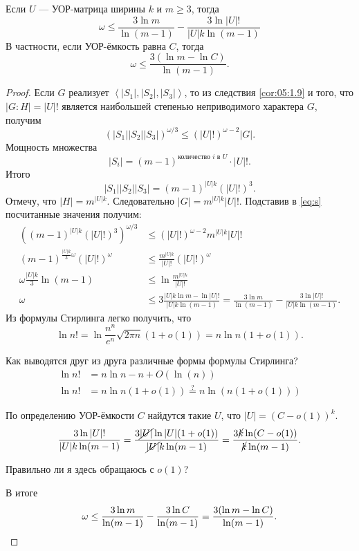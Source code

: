\begin{corollary}\label{cor:05:3.6}
  Если $U$ --- УОР-матрица ширины $k$ и $m \geq 3$, тогда 
  \[
  	\omega \leq \frac{3 \ln m}{\ln(m-1)} - \frac{3 \ln |U|!}{|U| k \ln(m-1)}
  \]
  В частности, если УОР-ёмкость равна $C$, тогда
  \[
  	\omega \leq \frac{3(\ln m - \ln C)}{\ln(m-1)}.
  \]
\end{corollary}
\begin{proof}
  Если $G$ реализует $\left\langle |S_1|,|S_2|,|S_3| \right\rangle$, то из следствия \ref{cor:05:1.9} и того, что $|G:H|=|U|!$ является наибольшей степенью неприводимого характера $G$, получим
  \begin{equation}\label{eq:s}
  	(|S_1||S_2||S_3|)^{\omega/3} \leq (|U|!)^{\omega-2}|G|.
  \end{equation}
  Мощность множества
  \[
  	|S_i|=(m-1)^{\text{количество $i$ в $U$}}\cdot |U|!.
  \]
  Итого
  \[
  	|S_1||S_2||S_3| = (m-1)^{|U|k}(|U|!)^3.
  \]
  Отмечу, что $|H|=m^{|U|k}$. Следовательно $|G|=m^{|U|k}|U|!$. Подставив в \eqref{eq:s} посчитанные значения получим:
  \begin{align*}
  	((m-1)^{|U|k}(|U|!)^3)^{\omega/3} & \leq (|U|!)^{\omega-2}m^{|U|k}|U|!\\
  	(m-1)^{\frac{|U|k}{3} \omega} (|U|!)^\omega & \leq \frac{m^{|U|k}}{|U|!}(|U|!)^\omega\\
  	\omega \frac{|U|k}{3} \ln (m-1) & \leq \ln \frac{m^{|U|k}}{|U|!}\\
  	\omega & \leq 3 \frac{|U|k \ln m - \ln |U|!}{|U|k \ln(m-1)} = \frac{3 \ln m}{\ln (m-1)} - \frac{3 \ln |U|!}{|U|k \ln(m-1)}.
  \end{align*}
  Из формулы Стирлинга легко получить, что
  \[
  	\ln n! = \ln \frac{n^n}{e^n} \sqrt{2 \pi n} (1 + o(1)) = n \ln n (1 + o(1)).
  \]
  \begin{question}
    Как выводятся друг из друга различные формы формулы Стирлинга?
    \begin{align*}
      \ln n! & = n \ln n - n + O(\ln(n))\\
      \ln n! & = n \ln n (1 + o(1)) \overset{?}{=} n \ln (n (1 + o(1)))
    \end{align*}
  \end{question}
  По определению УОР-ёмкости $C$ найдутся такие $U$, что $|U|=(C - o(1))^k$.
  \[
  	\frac{3 \ln |U|!}{|U|k \ln(m-1)} = \frac{3 \cancel{|U|} \ln |U| (1+o(1))}{\cancel{|U|}k \ln (m-1)} = \frac{3 \cancel{k} \ln (C - o(1))}{\cancel{k} \ln (m-1)}.
  \]
  \begin{question}
    Правильно ли я здесь обращаюсь с $o(1)$?
  \end{question}
  В итоге
  \[
  	\omega \leq \frac{3 \ln m}{\ln (m-1)} - \frac{3 \ln C}{\ln (m-1)} = \frac{3 (\ln m - \ln C)}{\ln (m-1)}. \qedhere
  \]
\end{proof}

